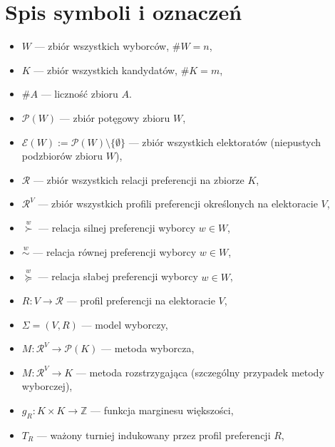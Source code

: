 \documentclass[12pt,a4paper]{mwrep}
\begin{document}
	\chapter*{Spis symboli i oznaczeń}
		
	\begin{itemize}
		\item \(W\) — zbiór wszystkich wyborców, \(\#W = n\),
		\item \(K\) — zbiór wszystkich kandydatów, \(\#K = m\),

		\item \(\#A\) — liczność zbioru \(A\).
		
		\item \(\mathcal{P}(W)\) — zbiór potęgowy zbioru \(W\),
		\item \(\mathcal{E}(W) := \mathcal{P}(W) \setminus \{\emptyset\}\) — zbiór wszystkich elektoratów (niepustych podzbiorów zbioru \(W\)),
		
		\item \(\mathcal{R}\) — zbiór wszystkich relacji preferencji na zbiorze \(K\),
		\item \(\mathcal{R}^{V}\) — zbiór wszystkich profili preferencji określonych na elektoracie \(V\),
		
		\item \(\overset{w}{\succ}\) — relacja silnej preferencji wyborcy \(w \in W\),
		\item \(\overset{w}{\sim}\) — relacja równej preferencji wyborcy \(w \in W\),
		\item \(\overset{w}{\succcurlyeq}\) — relacja słabej preferencji wyborcy \(w \in W\),

		
		\item \(R : V \to \mathcal{R}\) — profil preferencji na elektoracie \(V\),
		\item \(\Sigma = (V, R)\) — model wyborczy,
		
		\item \(M : \mathcal{R}^{V} \to \mathcal{P}(K)\) — metoda wyborcza,
		\item \(M : \mathcal{R}^{V} \to K\) — metoda rozstrzygająca (szczególny przypadek metody wyborczej),
		
		\item \(g_R : K \times K \to \mathbb{Z}\) — funkcja marginesu większości,
		
		\item \(T_R\) — ważony turniej indukowany przez profil preferencji \(R\),
		
		
	\end{itemize}
	
\end{document}

